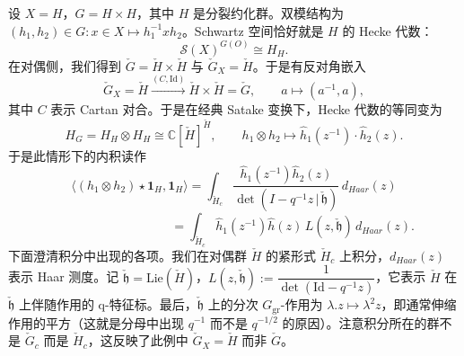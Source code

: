 \begin{exmp}
  设 $X=H$，$G=H\times H$，其中 $H$ 是分裂约化群。双模结构为 $(h_1,h_2)\in G:x\in X\mapsto h_1^{-1}xh_2$。Schwartz 空间恰好就是 $H$ 的 Hecke 代数：
  \[
    \mathcal S(X)^{G(O)}\cong H_H.
  \]
  在对偶侧，我们得到 $\check G=\check H\times\check H$ 与 $\check G_X=\check H$。于是有反对角嵌入
  \[
    \check G_X=\check H\xrightarrow{(C,\mathrm{Id})}\check H\times\check H=\check G,\qquad a\mapsto(a^{-1},a),
  \]
  其中 $C$ 表示 Cartan 对合。于是在经典 Satake 变换下，Hecke 代数的等同变为
  \[
    H_G=H_H\otimes H_H\cong\mathbb C[\check H]^{\check H},\qquad h_1\otimes h_2\mapsto\hat h_1(z^{-1})\cdot\hat h_2(z).
  \]
  于是此情形下的内积读作
  \begin{equation}
    \langle(h_1\otimes h_2)\star\mathbf 1_H,\mathbf 1_H\rangle
    =\int_{\check H_c}\frac{\hat h_1(z^{-1})\hat h_2(z)}{\det(I-q^{-1}z\,|\,\check{\mathfrak h})}\,d_{Haar}(z)
    \label{eq:8-7}
  \end{equation}
  \begin{equation}
    \phantom{\langle(h_1\otimes h_2)\star\mathbf 1_H,\mathbf 1_H\rangle}
    =\int_{\check H_c}\hat h_1(z^{-1})\hat h(z)\,L(z,\check{\mathfrak h})\,d_{Haar}(z).
    \label{eq:8-8}
  \end{equation}
  下面澄清积分中出现的各项。我们在对偶群 $\check H$ 的紧形式 $\check H_c$ 上积分，$d_{Haar}(z)$ 表示 Haar 测度。记 $\check{\mathfrak h}=\mathrm{Lie}(\check H)$，$L(z,\check{\mathfrak h}):=\dfrac{1}{\det(\mathrm{Id}-q^{-1}z)}$，它表示 $\check H$ 在 $\check{\mathfrak h}$ 上伴随作用的 q-特征标。最后，$\check{\mathfrak h}$ 上的分次 $G_{\mathrm{gr}}$-作用为 $\lambda.z\mapsto\lambda^2z$，即通常伸缩作用的平方（这就是分母中出现 $q^{-1}$ 而不是 $q^{-1/2}$ 的原因）。注意积分所在的群不是 $\check G_c$ 而是 $\check H_c$，这反映了此例中 $\check G_X=\check H$ 而非 $\check G$。
\end{exmp}

